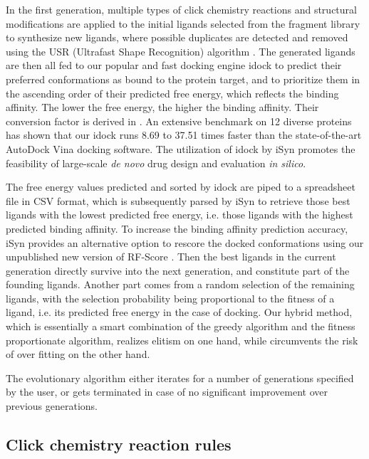 In the first generation, multiple types of click chemistry reactions and structural modifications are applied to the initial ligands selected from the fragment library to synthesize new ligands, where possible duplicates are detected and removed using the USR (Ultrafast Shape Recognition) algorithm \citep{1379}. The generated ligands are then all fed to our popular and fast docking engine idock \citep{1153} to predict their preferred conformations as bound to the protein target, and to prioritize them in the ascending order of their predicted free energy, which reflects the binding affinity. The lower the free energy, the higher the binding affinity. Their conversion factor is derived in \citep{1362}. An extensive benchmark on 12 diverse proteins \citep{1362} has shown that our idock \citep{1153} runs 8.69 to 37.51 times faster than the state-of-the-art AutoDock Vina \citep{595} docking software. The utilization of idock by iSyn promotes the feasibility of large-scale \textit{de novo} drug design and evaluation \textit{in silico}.

The free energy values predicted and sorted by idock are piped to a spreadsheet file in CSV format, which is subsequently parsed by iSyn to retrieve those best ligands with the lowest predicted free energy, i.e. those ligands with the highest predicted binding affinity. To increase the binding affinity prediction accuracy, iSyn provides an alternative option to rescore the docked conformations using our unpublished new version of RF-Score \citep{564}. Then the best ligands in the current generation directly survive into the next generation, and constitute part of the founding ligands. Another part comes from a random selection of the remaining ligands, with the selection probability being proportional to the fitness of a ligand, i.e. its predicted free energy in the case of docking. Our hybrid method, which is essentially a smart combination of the greedy algorithm and the fitness proportionate algorithm, realizes elitism on one hand, while circumvents the risk of over fitting on the other hand.

The evolutionary algorithm either iterates for a number of generations specified by the user, or gets terminated in case of no significant improvement over previous generations.

\subsection{Click chemistry reaction rules}

